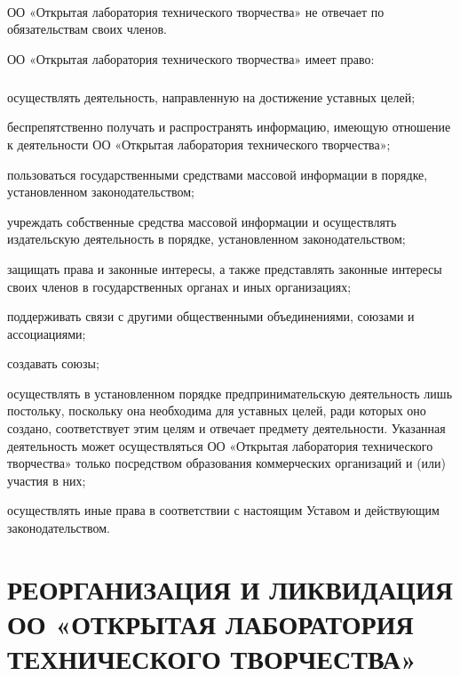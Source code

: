 \documentclass[a4paper,fontsize=14pt,titlepage]{scrartcl}
\makeatletter
\newenvironment{numberedpars}{%
  \addtocounter{secnumdepth}{1}
  \renewcommand\theparagraph{\arabic{section}.\arabic{paragraph}}
  \renewcommand\@seccntformat[1]
  {\expandafter\ifx\csname##1\endcsname\paragraph\csname 
  the##1\endcsname\else\csname the##1\endcsname\quad\fi}
  \let\old@par=\par
  \def\new@par{\let\par=\old@par\paragraph{}\let\par=\new@par}
  \let\par=\new@par
  \par
}{
  \addtocounter{secnumdepth}{-1}
}
\newenvironment{numberedsubpars}{%
  \addtocounter{secnumdepth}{1}
  \renewcommand\thesubparagraph{\arabic{section}.\arabic{paragraph}.\arabic{subparagraph}}
  \renewcommand\@seccntformat[1]
  {\expandafter\ifx\csname##1\endcsname\subparagraph\csname 
  the##1\endcsname\else\csname the##1\endcsname\quad\fi}
  \let\old@@par=\par
  \def\new@@par{\let\par=\old@par\subparagraph{}\let\par=\new@@par}
  \let\par=\new@@par
  \par
}{
  \addtocounter{secnumdepth}{-1}
  \let\par=\old@@par
}
\let\@@@section=\section
\renewcommand\section[1]{\@@@section{\MakeUppercase{#1}}}
\makeatother
\begin{document}
\begin{numberedpars}
ОО «Открытая лаборатория технического творчества» не отвечает по обязательствам своих членов. 

ОО «Открытая лаборатория технического творчества» имеет право:
\begin{numberedsubpars}
осуществлять деятельность, направленную на достижение уставных целей;

беспрепятственно получать и распространять информацию, имеющую отношение к деятельности ОО «Открытая лаборатория
технического творчества»;

пользоваться государственными средствами массовой информации в порядке, установленном законодательством;

учреждать собственные средства массовой информации и осуществлять издательскую деятельность в порядке, установленном
законодательством;

защищать права и законные интересы, а также представлять законные интересы своих членов в государственных органах и иных
организациях;

поддерживать связи с другими общественными объединениями, союзами и ассоциациями;

создавать союзы;

осуществлять в установленном порядке предпринимательскую деятельность лишь постольку, поскольку она необходима для
уставных целей, ради которых оно создано, соответствует этим целям и отвечает предмету деятельности. Указанная
деятельность может осуществляться ОО «Открытая лаборатория технического творчества» только посредством образования
коммерческих организаций и (или) участия в них;

осуществлять иные права в соответствии с настоящим Уставом и действующим законодательством.
\end{numberedsubpars}
\end{numberedpars}

\section{Реорганизация и ликвидация ОО «Открытая лаборатория технического творчества»}
\end{document}
